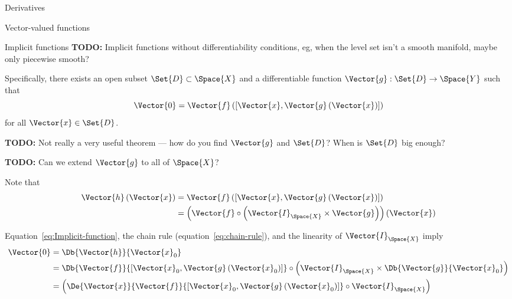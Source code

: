 \begin{plSection}{Derivatives}
\begin{plSection}{Vector-valued functions}
\begin{plSection}{Implicit functions}
\textbf{TODO:} Implicit functions without differentiability
conditions, eg, when the level set isn't a smooth manifold,
maybe only piecewise smooth?

Specifically, 
there exists an open subset $\Set{D}  \subset \Space{X}$
and a differentiable function $\Vector{g} : \Set{D} \rightarrow \Space{Y}$
such that 
\begin{equation}\label{eq:Implicit-function}
\Vector{0} = \Vector{f}\left( \left[ \Vector{x} , \Vector{g} \left( \Vector{x} \right) \right] \right)
\end{equation}
for all 
$\Vector{x} \in  \Set{D}$.

\textbf{TODO:} Not really a very useful theorem --- 
how do you find $\Vector{g}$ and $\Set{D}$?
When is $\Set{D}$ big enough?

\textbf{TODO:} Can we extend $\Vector{g}$ to all of $\Space{X}$?

Note that 
\begin{equation}
\begin{aligned}
\Vector{h}\left(\Vector{x}\right) 
& = 
\Vector{f}\left( \left[ \Vector{x} , \Vector{g} \left( \Vector{x} \right) \right] \right)
\\
& =
\left( \Vector{f} \circ \left( \Vector{I}_{\Space{X}} \times \Vector{g} \right) \right) 
\left( \Vector{x} \right)
\end{aligned} 
\end{equation}

Equation~\ref{eq:Implicit-function}, 
the chain rule (equation~\ref{eq:chain-rule}),
and the linearity of $\Vector{I}_{\Space{X}}$
imply
\begin{equation}\label{eq:Implicit-derivative}
\begin{aligned}
\Vector{0}
 & = \Db{\Vector{h}}{\Vector{x}_0}
\\
& = 
\Db{\Vector{f}}
{\left[ \Vector{x}_0 , \Vector{g}\left( \Vector{x}_0 \right) \right]}
\circ \left( 
\Vector{I}_{\Space{X}} 
\times 
\Db{\Vector{g}}{\Vector{x}_0}
\right)
\\
& = 
\left(
\De{\Vector{x}}
{\Vector{f}}
{\left[ 
\Vector{x}_0 , \Vector{g} 
\left( \Vector{x}_0 \right)
 \right]}
\circ 
\Vector{I}_{\Space{X}}
\right)
\end{aligned}
\end{equation}


\end{plSection}
\end{plSection}
\end{plSection}
